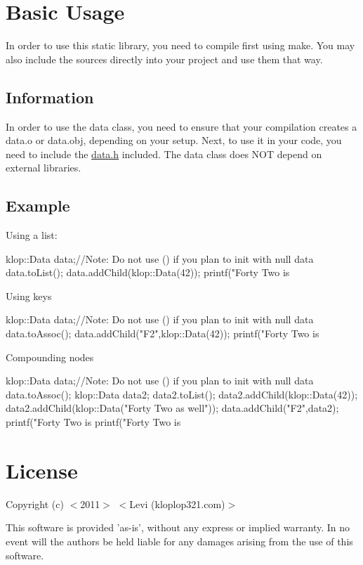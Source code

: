 \hypertarget{index_usage}{}\section{Basic Usage}\label{index_usage}
In order to use this static library, you need to compile first using make. You may also include the sources directly into your project and use them that way. \hypertarget{index_basic_info}{}\subsection{Information}\label{index_basic_info}
In order to use the data class, you need to ensure that your compilation creates a data.o or data.obj, depending on your setup. Next, to use it in your code, you need to include the \hyperlink{data_8h}{data.h} included. The data class does NOT depend on external libraries.\hypertarget{index_syntax_example}{}\subsection{Example}\label{index_syntax_example}
Using a list: 
\begin{DoxyCode}
 klop::Data data;//Note: Do not use () if you plan to init with null data
 data.toList();
 data.addChild(klop::Data(42));
 printf("Forty Two is %
\end{DoxyCode}
 Using keys 
\begin{DoxyCode}
 klop::Data data;//Note: Do not use () if you plan to init with null data
 data.toAssoc();
 data.addChild("F2",klop::Data(42));
 printf("Forty Two is %
\end{DoxyCode}
 Compounding nodes 
\begin{DoxyCode}
 klop::Data data;//Note: Do not use () if you plan to init with null data
 data.toAssoc();
 klop::Data data2;
 data2.toList();
 data2.addChild(klop::Data(42));
 data2.addChild(klop::Data("Forty Two as well"));
 data.addChild("F2",data2);
 printf("Forty Two is %
 printf("Forty Two is %
\end{DoxyCode}
 \hypertarget{index_license}{}\section{License}\label{index_license}
Copyright (c) $<$2011$>$ $<$Levi (kloplop321.com)$>$

This software is provided 'as-\/is', without any express or implied warranty. In no event will the authors be held liable for any damages arising from the use of this software.

